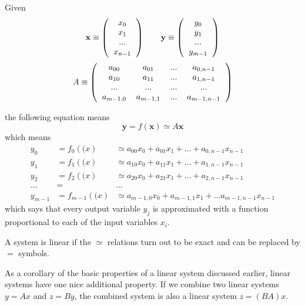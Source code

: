 \documentclass[justified, sixbynine]{tufte-book}
\theoremstyle{plain}%
\newtheorem * {corollary}{Corollary}
\theoremstyle{definition}
\theoremstyle{remark}
\newtheorem * {remark}{Remark}
\newtheorem * {note}{Note}
\begin{document}
\begin{fullwidth}
Given
\begin{equation}
\mathbf{x} \equiv \left(\begin{tabular}{c}$x_0$\\$x_1$\\...\\$x_{n-1}$\end{tabular}\right)\qquad
\mathbf{y} \equiv \left(\begin{tabular}{c}$y_0$\\$y_1$\\...\\$y_{m-1}$\end{tabular}\right)
\end{equation}
\begin{equation}
A \equiv \left(\begin{tabular}{cccc}
$a_{00}$ & $a_{01}$ & ... & $a_{0, n-1}$ \\
$a_{10}$ & $a_{11}$ & ... & $a_{1, n-1}$ \\
... & ... & ... & ... \\
$a_{m-1, 0}$ & $a_{m-1, 1}$ & ... & $a_{m-1, n-1}$
\end{tabular}\right)
\end{equation}

the following equation means
\begin{equation}
\mathbf{y} = f(\mathbf{x}) \simeq A \mathbf{x}
\end{equation}
which means
\begin{eqnarray}
y_0 &= f_0(\mathbf(x) &\simeq a_{00} x_0 + a_{01} x_1 + ... + a_{0, n-1}x_{n-1} \\
y_1 &= f_1(\mathbf(x) &\simeq a_{10} x_0 + a_{11} x_1 + ... + a_{1, n-1}x_{n-1} \\
y_2 &= f_2(\mathbf(x) &\simeq a_{20} x_0 + a_{21} x_1 + ... + a_{2, n-1}x_{n-1} \\
... &=& ... \\
y_{m-1} &= f_{m-1}(\mathbf(x) &\simeq a_{m-1, 0} x_0 + a_{m-1, 1} x_1 + ...
a_{m-1, n-1}x_{n-1}
\end{eqnarray}
which says that every output variable $y_j$ is approximated with a function proportional to each of the input variables $x_i$.

A system is linear if the $\simeq$ relations turn out to be exact and can be replaced by $=$ symbols.

As a corollary of the basic properties of a linear system discussed earlier, linear systems have one nice additional property. If we combine two linear systems $y=Ax$ and $z=By$, the combined system is also a linear system $z = (BA)x$.


\end{fullwidth}
\end{document}
